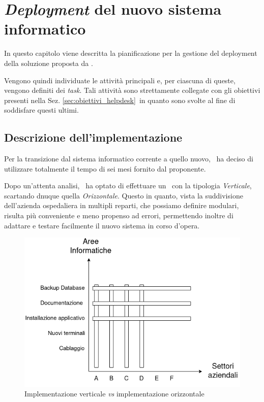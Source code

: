 \chapter{\textit{Deployment} del nuovo sistema informatico}\label{ch:implementazione}

In questo capitolo viene descritta la pianificazione per la gestione del deployment della soluzione proposta da \azienda.


Vengono quindi individuate le attività principali e, per ciascuna di queste, vengono definiti dei \textit{task}.
Tali attività sono strettamente collegate con gli obiettivi presenti nella Sez. \ref{sec:obiettivi_helpdesk}~in quanto sono svolte al fine di soddisfare questi ultimi.

\section{Descrizione dell’implementazione}\label{sec:desc_implementazione}

	Per la transizione dal sistema informatico corrente a quello nuovo, \azienda~ha deciso di utilizzare totalmente il tempo di sei mesi fornito dal proponente.
	
	Dopo un'attenta analisi, \azienda~ha optato di effettuare un \rollout~con la tipologia \textit{Verticale}, scartando dnuque quella \textit{Orizzontale}.
	Questo in quanto, vista la suddivisione dell'azienda ospedaliera in multipli reparti, che possiamo definire modulari, risulta più conveniente e meno propenso ad errori, permettendo inoltre di adattare e testare facilmente il nuovo sistema in corso d'opera.
	
	\begin{figure}[h!]
		\centering
		\includegraphics[width=\linewidth]{img/implementazione.png}
		\caption{Implementazione verticale \textit{vs} implementazione orizzontale}
		\label{fig:implementazione}
	\end{figure}

